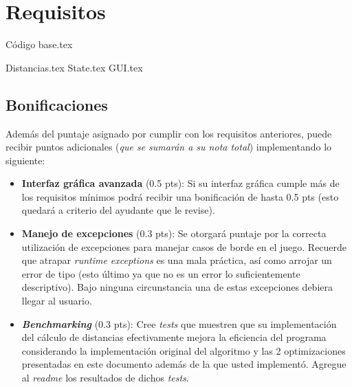 \section{Requisitos}
  
  {Código base.tex}

  {Distancias.tex}
  {State.tex}
  {GUI.tex}

  \subsection{Bonificaciones}
    Además del puntaje asignado por cumplir con los requisitos anteriores, puede recibir 
    puntos adicionales (\emph{que se sumarán a su nota total}) implementando lo siguiente:
    \begin{itemize}
      \item \textbf{Interfaz gráfica avanzada} (0.5 pts): Si su interfaz gráfica cumple 
        más de los requisitos mínimos podrá recibir una bonificación de hasta 0.5 pts 
        (esto quedará a criterio del ayudante que le revise).
      \item \textbf{Manejo de excepciones} (0.3 pts): Se otorgará puntaje por la correcta 
        utilización de excepciones para manejar casos de borde en el juego.
        Recuerde que atrapar \textit{runtime exceptions} es una mala práctica, así como
        arrojar un error de tipo  (esto último ya que no es un error lo 
        suficientemente descriptivo).
        Bajo ninguna circunstancia una de estas excepciones debiera llegar al usuario.
      \item \textbf{\textit{Benchmarking}} (0.3 pts): Cree \textit{tests} que muestren que 
        su implementación del cálculo de distancias efectivamente mejora la eficiencia del
        programa considerando la implementación original del algoritmo y las 2 
        optimizaciones presentadas en este documento además de la que usted implementó.
        Agregue al \textit{readme} los resultados de dichos \textit{tests}.
    \end{itemize}
  
